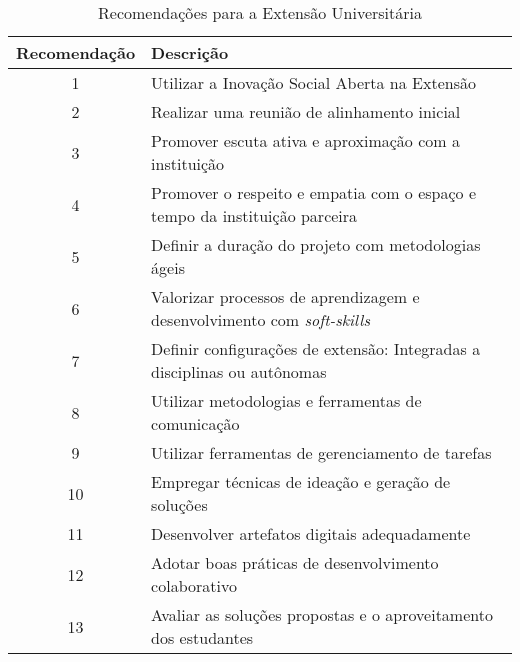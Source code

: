 \begin{table}[H]
\centering
\caption{Recomendações para a Extensão Universitária}
\begin{tabular}{|c|p{11cm}|}
\hline
\textbf{Recomendação} & \textbf{Descrição} \\ \hline
1 & Utilizar a Inovação Social Aberta na Extensão \\ \hline
2 & Realizar uma reunião de alinhamento inicial \\ \hline
3 & Promover escuta ativa e aproximação com a instituição \\ \hline
4 & Promover o respeito e empatia com o espaço e tempo da instituição parceira  \\ \hline
5 & Definir a duração do projeto com metodologias ágeis \\ \hline
6 & Valorizar processos de aprendizagem e desenvolvimento com \textit{soft-skills} \\ \hline
7 & Definir configurações de extensão: Integradas a disciplinas ou autônomas \\ \hline
8 & Utilizar metodologias e ferramentas de comunicação \\ \hline
9 & Utilizar ferramentas de gerenciamento de tarefas \\ \hline
10 & Empregar técnicas de ideação e geração de soluções \\ \hline
11 & Desenvolver artefatos digitais adequadamente \\ \hline
12 & Adotar boas práticas de desenvolvimento colaborativo \\ \hline
13 & Avaliar as soluções propostas e o aproveitamento dos estudantes \\ \hline
\end{tabular}
\end{table}
